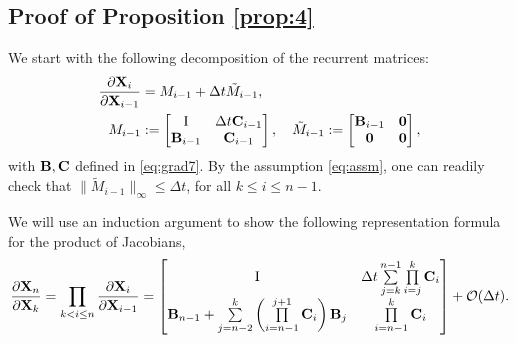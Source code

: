 \documentclass{article} \usepackage{iclr2021_conference,times}
\newcommand{\bX}{{\bf X}}
\newcommand{\bB}{{\bf B}}
\newcommand{\bC}{{\bf C}}
\newcommand{\ord}{{\mathcal O}}
\newcommand{\Dt}{{\Delta t}}
\newcommand{\ind}{\mathrm{I}}
\begin{document}
\subsection{Proof of Proposition \ref{prop:4}}
\label{app:proof_vanish}
We start with the following decomposition of the recurrent matrices:
\begin{align*}
     \frac{\partial \bX_i}{\partial \bX_{i-1}} &= M_{i-1} + \Dt \tilde{M}_{i-1}, \\
 M_{i-1}&:= \begin{bmatrix}
                                                           \ind  & \Dt \bC_{i-1} \\ 
                                                              \bB_{i-1} & \bC_{i-1} 
                                                              \end{bmatrix},  \quad
 \tilde{M}_{i-1}:= \begin{bmatrix}
                                                           \bB_{i-1}  & {\bf 0} \\ 
                                                              {\bf 0} & {\bf 0} 
                                                              \end{bmatrix},                                                               
\end{align*}
with $\bB,\bC$ defined in \eqref{eq:grad7}. By the assumption \eqref{eq:assm}, one can readily check that $\|\tilde{M}_{i-1}\|_{\infty} \leq \Dt$, for all $k \leq i \leq n-1$.

We will use an induction argument to show the following representation formula for the product of Jacobians,
\begin{equation}
\label{eq:vg2}
 \frac{\partial \bX_n}{\partial \bX_k} = \prod\limits_{k < i \leq n}  \frac{\partial \bX_i}{\partial \bX_{i-1}} =   \begin{bmatrix}
                                                           \ind   & \Dt \sum\limits_{j=k}^{n-1} \prod\limits_{i=j}^k \bC_i \\ 
                    \bB_{n-1}+  \sum\limits_{j=n-2}^{k}\left(\prod\limits_{i=n-1}^{j+1}\bC_i\right)\bB_j  & \prod\limits_{i=n-1}^k \bC_i
                                                              \end{bmatrix} 
                                                  + \ord(\Dt)            .\end{equation}
\end{document}
